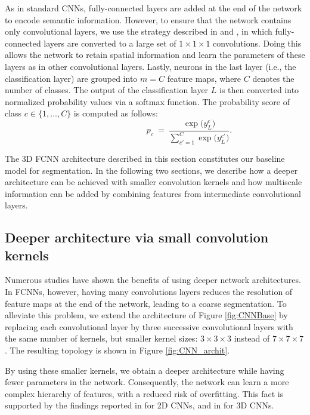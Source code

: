 \documentclass[twoside,fleqn,espcrc2]{elsarticle}
\newcommand{\vold}[1]{$#1\!\times\!#1\!\times\!#1$}
\begin{document}
As in standard CNNs, fully-connected layers are added at the end of the network to encode semantic information. However, to ensure that the network contains only convolutional layers, we use the strategy described in \cite{long2015fully} and \cite{kamnitsas2016efficient}, in which fully-connected layers are converted to a large set of \vold{1} convolutions. Doing this allows the network to retain spatial information and learn the parameters of these layers as in other convolutional layers. Lastly, neurons in the last layer (i.e., the classification layer) are grouped into $m=C$ feature maps, where $C$ denotes the number of classes. The output of the classification layer $L$ is then converted into normalized probability values via a softmax function. The probability score of class $c \in \{1, \ldots, C\}$ is computed as follows:
\begin{equation}
    \qquad \qquad \qquad \qquad \
        p_c \ = \ \frac{\exp\big(y^c_L\big)}{\sum^{C}_{c'=1} \exp\big(y^{c'}_L\big)}.
\end{equation}

The 3D FCNN architecture described in this section constitutes our baseline model for segmentation. In the following two sections, we describe how a deeper architecture can be achieved with smaller convolution kernels and how multiscale information can be added by combining features from intermediate convolutional layers.


\subsection{Deeper architecture via small convolution kernels}
\label{ssec:smallKernels}

Numerous studies have shown the benefits of using deeper network architectures. In FCNNs, however, having many convolutions layers reduces the resolution of feature maps at the end of the network, leading to a coarse segmentation. To alleviate this problem, we extend the architecture of Figure \ref{fig:CNNBase} by replacing each convolutional layer by three successive convolutional layers with the same number of kernels, but smaller kernel sizes: \vold{3} instead of \vold{7}. The resulting topology is shown in Figure \ref{fig:CNN_archit}.

By using these smaller kernels, we obtain a deeper architecture while having fewer parameters in the network. Consequently, the network can learn a more complex hierarchy of features, with a reduced risk of overfitting. This fact is supported by the findings reported in \cite{simonyan2014very} for 2D CNNs, and in \cite{kamnitsas2016efficient} for 3D CNNs. %
\end{document}
